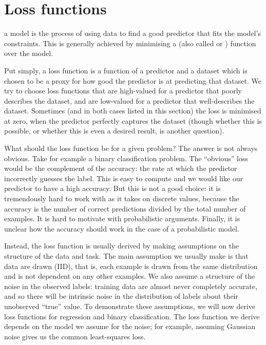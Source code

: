 \section{Loss functions}
\label{sec:training}
    
     a model is the process of using data to find a good predictor that fits the model's constraints. This is generally achieved by minimising a  (also called  or ) function over the model.

    Put simply, a loss function is a function of a predictor and a dataset which is chosen to be a proxy for how good the predictor is at predicting that dataset. We try to choose loss functions that are high-valued for a predictor that poorly describes the dataset, and are low-valued for a predictor that well-describes the dataset. Sometimes (and in both cases listed in this section) the loss is minimised at zero, when the predictor perfectly captures the dataset (though whether this is possible, or whether this is even a desired result, is another question).

    What should the loss function be for a given problem? The answer is not always obvious. Take for example a binary classification problem. The ``obvious'' loss would be the complement of the accuracy: the rate at which the predictor incorrectly guesses the label. This is easy to compute and we would like our predictor to have a high accuracy. But this is not a good choice: it is tremendously hard to work with as it takes on discrete values, because the accuracy is the number of correct predictions divided by the total number of examples. It is hard to motivate with probabilistic arguments. Finally, it is unclear how the accuracy should work in the case of a probabilistic model.

    Instead, the loss function is usually derived by making assumptions on the structure of the data and task. The main assumption we usually make is that data are drawn  (IID), that is, each example is drawn from the same distribution and is not dependent on any other examples. We also assume a structure of the noise in the observed labels: training data are almost never completely accurate, and so there will be intrinsic noise in the distribution of labels about their unobserved ``true'' value. To demonstrate these assumptions, we will now derive loss functions for regression and binary classification. The loss function we derive depends on the model we assume for the noise; for example, assuming Gaussian noise gives us the common least-squares loss.

